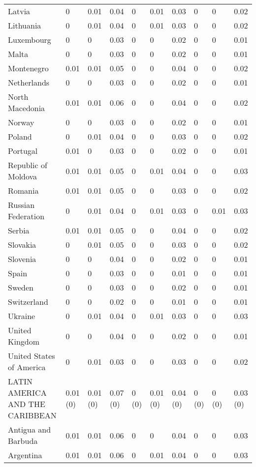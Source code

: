 \begin{longtable}[t]{llllllllll}
Latvia & 0 & 0.01 & 0.04 & 0 & 0.01 & 0.03 & 0 & 0 & 0.02\\
Lithuania & 0 & 0.01 & 0.04 & 0 & 0.01 & 0.03 & 0 & 0 & 0.02\\
Luxembourg & 0 & 0 & 0.03 & 0 & 0 & 0.02 & 0 & 0 & 0.01\\
Malta & 0 & 0 & 0.03 & 0 & 0 & 0.02 & 0 & 0 & 0.01\\
Montenegro & 0.01 & 0.01 & 0.05 & 0 & 0 & 0.04 & 0 & 0 & 0.02\\
Netherlands & 0 & 0 & 0.03 & 0 & 0 & 0.02 & 0 & 0 & 0.01\\
North Macedonia & 0.01 & 0.01 & 0.06 & 0 & 0 & 0.04 & 0 & 0 & 0.02\\
Norway & 0 & 0 & 0.03 & 0 & 0 & 0.02 & 0 & 0 & 0.01\\
Poland & 0 & 0.01 & 0.04 & 0 & 0 & 0.03 & 0 & 0 & 0.02\\
Portugal & 0.01 & 0 & 0.03 & 0 & 0 & 0.02 & 0 & 0 & 0.01\\
Republic of Moldova & 0.01 & 0.01 & 0.05 & 0 & 0.01 & 0.04 & 0 & 0 & 0.03\\
Romania & 0.01 & 0.01 & 0.05 & 0 & 0 & 0.03 & 0 & 0 & 0.02\\
Russian Federation & 0 & 0.01 & 0.04 & 0 & 0.01 & 0.03 & 0 & 0.01 & 0.03\\
Serbia & 0.01 & 0.01 & 0.05 & 0 & 0 & 0.04 & 0 & 0 & 0.02\\
Slovakia & 0 & 0.01 & 0.05 & 0 & 0 & 0.03 & 0 & 0 & 0.02\\
Slovenia & 0 & 0 & 0.04 & 0 & 0 & 0.02 & 0 & 0 & 0.01\\
Spain & 0 & 0 & 0.03 & 0 & 0 & 0.01 & 0 & 0 & 0.01\\
Sweden & 0 & 0 & 0.03 & 0 & 0 & 0.02 & 0 & 0 & 0.01\\
Switzerland & 0 & 0 & 0.02 & 0 & 0 & 0.01 & 0 & 0 & 0.01\\
Ukraine & 0 & 0.01 & 0.04 & 0 & 0.01 & 0.03 & 0 & 0 & 0.03\\
United Kingdom & 0 & 0 & 0.04 & 0 & 0 & 0.02 & 0 & 0 & 0.01\\
United States of America & 0 & 0.01 & 0.03 & 0 & 0 & 0.03 & 0 & 0 & 0.02\\
LATIN AMERICA AND THE CARIBBEAN & 0.01 (0) & 0.01 (0) & 0.07 (0) & 0 (0) & 0.01 (0) & 0.04 (0) & 0 (0) & 0 (0) & 0.03 (0)\\
Antigua and Barbuda & 0.01 & 0.01 & 0.06 & 0 & 0 & 0.04 & 0 & 0 & 0.03\\
Argentina & 0.01 & 0.01 & 0.06 & 0 & 0.01 & 0.04 & 0 & 0 & 0.03\\

\end{longtable}
